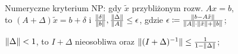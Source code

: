 \entry
Numeryczne kryterium NP:
gdy $\tilde{x}$ przybliżonym rozw. $Ax=b$,\\
to $(A+\Delta)\tilde{x}=b+\delta$
i $\frac{\|\delta\|}{\|b\|}, \frac{\|\Delta\|}{\|A\|} \leq \epsilon$,
gdzie $\epsilon \coloneqq \frac{\|b-A\tilde{x}\|}{\|A\| \cdot \|\tilde{x}\| + \|b\| }$;


\entry
$\|\Delta\| < 1$,
to $I + \Delta$ nieosobliwa
oraz $\|(I + \Delta)^{-1}\| \leq \frac{1}{1 - \|\Delta\|}$;
